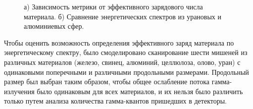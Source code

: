 \documentclass[a4paper]{panl}
\begin{document}
\begin{figure}[t]
    \begin{center}
        \begin{minipage}[h]{0.49\linewidth}
        \end{minipage}
        \hfill
        \begin{minipage}[h]{0.49\linewidth}
        \end{minipage}
        \vspace{-3mm}
        \caption{а) Зависимость метрики от эффективного зарядового числа материала.
 б) Сравнение энергетических спектров из урановых и алюминиевых сфер.}
    \end{center}
    \vspace{-5mm}
\end{figure}

Чтобы оценить возможность определения эффективного заряд материала по энергетическому спектру, было смоделировано сканирование шести мишеней из различных материалов (железо, свинец, алюминий, целлюлоза, олово, уран) с одинаковыми поперечными и различными продольными размерами. Продольный размер был выбран таким образом, чтобы общее ослабление потока гамма-излучения было одинаковым для всех материалов, и их нельзя было различить только путем анализа количества гамма-квантов пришедших в детекторы.
\end{document}
